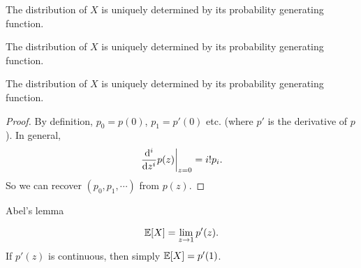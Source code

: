 \begin{note}
  \begin{field}
    \begin{thm}
      The distribution of $X$ is uniquely determined by its probability generating function.
    \end{thm}
  \end{field}
  \begin{field}
    \begin{thm}
      The distribution of $X$ is uniquely determined by its probability generating function.
    \end{thm}
  \end{field}
  \xplain{}%
\end{note}

%
\begin{note}
  \begin{field}
    \begin{thm}
      The distribution of $X$ is uniquely determined by its probability generating function.
    \end{thm}
  \end{field}
  \begin{field}
    \begin{proof}
      By definition, $p_0 = p(0)$, $p_1 = p'(0)$ etc. (where $p'$ is the derivative of $p$). In general,
      \[
        \left. \frac{\mathrm{d} ^i}{\mathrm{d} z^i}p(z) \right|_{z = 0} = i! p_i.
      \]
      So we can recover $(p_0, p_1, \cdots)$ from $p(z)$.
    \end{proof}
  \end{field}
  \xplain{}%
\end{note}

%
\begin{note}
  \begin{field}
    Abel's lemma
  \end{field}
  \begin{field}
    \begin{thm}
      \[
        \mathbb{E}[X] = \lim_{z\to 1}p'(z).
      \]
      If $p'(z)$ is continuous, then simply $\mathbb{E}[X] = p'(1)$.
    \end{thm}
  \end{field}
  \xplain{}%
\end{note}

